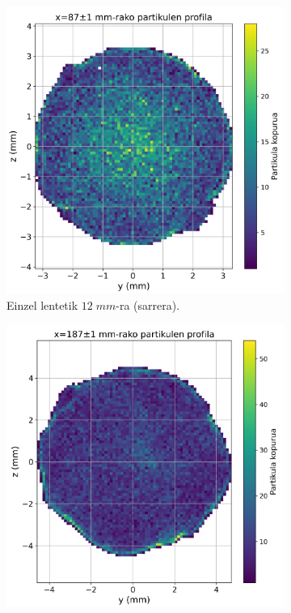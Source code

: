 \documentclass[12pt]{article}
\numberwithin{figure}{section}
\numberwithin{equation}{section}
\begin{document}
\begin{figure}[h]
    \centering
    \begin{subfigure}[b]{0.48\textwidth}
        \centering
        \includegraphics[width=\linewidth]{4 - Diseinua/enter_profile.png}
        \caption{Einzel lentetik $12\;mm$-ra (sarrera).}
        \label{fig:sarrera_profila}
    \end{subfigure}
    \hspace{0.01\textwidth}
    \begin{subfigure}[b]{0.48\textwidth}
        \centering
        \includegraphics[width=\linewidth]{4 - Diseinua/exit_profile.png}

\end{subfigure}
\end{figure}
\end{document}
